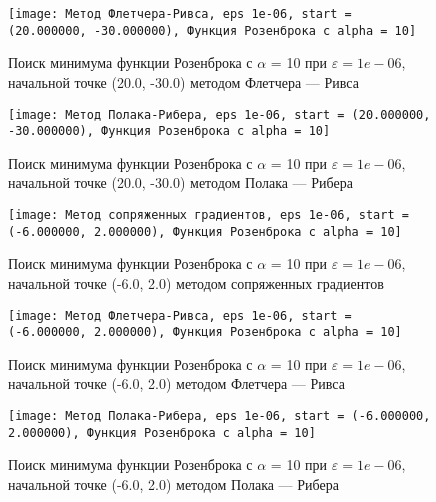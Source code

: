             \begin{figure}[H]
	        \centering
	        \texttt{[image: Метод Флетчера-Ривса, eps 1e-06, start = (20.000000, -30.000000), Функция Розенброка с alpha = 10]}%
	        \caption{Поиск минимума функции Розенброка с $\alpha$ = 10 при $\varepsilon = 1e-06$, начальной точке (20.0, -30.0) методом Флетчера --- Ривса}
	        \vspace*{-1.2cm}
            \end{figure}
            
            \begin{figure}[H]
	        \centering
	        \texttt{[image: Метод Полака-Рибера, eps 1e-06, start = (20.000000, -30.000000), Функция Розенброка с alpha = 10]}%
	        \caption{Поиск минимума функции Розенброка с $\alpha$ = 10 при $\varepsilon = 1e-06$, начальной точке (20.0, -30.0) методом Полака --- Рибера}
	        \vspace*{-1.2cm}
            \end{figure}
            
            \begin{figure}[H]
	        \centering
	        \texttt{[image: Метод сопряженных градиентов, eps 1e-06, start = (-6.000000, 2.000000), Функция Розенброка с alpha = 10]}%
	        \caption{Поиск минимума функции Розенброка с $\alpha$ = 10 при $\varepsilon = 1e-06$, начальной точке (-6.0, 2.0) методом сопряженных градиентов}
	        \vspace*{-1.2cm}
            \end{figure}
            
            \begin{figure}[H]
	        \centering
	        \texttt{[image: Метод Флетчера-Ривса, eps 1e-06, start = (-6.000000, 2.000000), Функция Розенброка с alpha = 10]}%
	        \caption{Поиск минимума функции Розенброка с $\alpha$ = 10 при $\varepsilon = 1e-06$, начальной точке (-6.0, 2.0) методом Флетчера --- Ривса}
	        \vspace*{-1.2cm}
            \end{figure}
            
            \begin{figure}[H]
	        \centering
	        \texttt{[image: Метод Полака-Рибера, eps 1e-06, start = (-6.000000, 2.000000), Функция Розенброка с alpha = 10]}%
	        \caption{Поиск минимума функции Розенброка с $\alpha$ = 10 при $\varepsilon = 1e-06$, начальной точке (-6.0, 2.0) методом Полака --- Рибера}
	        \vspace*{-1.2cm}
            \end{figure}
            